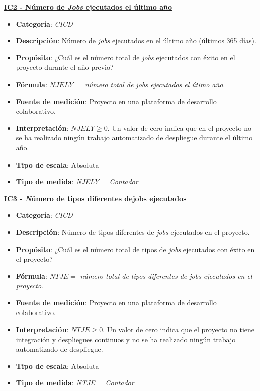 \textbf{\underline{IC2 - Número de \textit{Jobs} ejecutados el último año}}
\begin{itemize}
	\item \textbf{Categoría}: \textit{CICD}
	\item \textbf{Descripción}: Número de \textit{jobs} ejecutados en el último año (últimos 365 días).
	\item \textbf{Propósito}: ¿Cuál es el número total de \textit{jobs} ejecutados con éxito en el proyecto durante el año previo?
	\item \textbf{Fórmula}: $NJELY =$ \textit{número total de jobs ejecutados el útimo año}.
	\item \textbf{Fuente de medición}: Proyecto en una plataforma de desarrollo colaborativo.
	\item \textbf{Interpretación}: $NJELY \geq 0$. Un valor de cero indica que en el proyecto no se ha realizado ningún trabajo automatizado de despliegue durante el último año.
	\item \textbf{Tipo de escala}: Absoluta
	\item \textbf{Tipo de medida}: \textit{NJELY = Contador}
\end{itemize}

\textbf{\underline{IC3 - \textit Número de tipos diferentes de{jobs} ejecutados}}
\begin{itemize}
	\item \textbf{Categoría}: \textit{CICD}
	\item \textbf{Descripción}: Número de tipos diferentes de \textit{jobs} ejecutados en el proyecto.
	\item \textbf{Propósito}: ¿Cuál es el número total de tipos de \textit{jobs} ejecutados con éxito en el proyecto?
	\item \textbf{Fórmula}: $NTJE =$ \textit{número total de tipos diferentes de jobs ejecutados en el proyecto}.
	\item \textbf{Fuente de medición}: Proyecto en una plataforma de desarrollo colaborativo.
	\item \textbf{Interpretación}: $NTJE \geq 0$. Un valor de cero indica que el proyecto no tiene integración y despliegues continuos y no se ha realizado ningún trabajo automatizado de despliegue.
	\item \textbf{Tipo de escala}: Absoluta
	\item \textbf{Tipo de medida}: \textit{NTJE = Contador}
\end{itemize}

